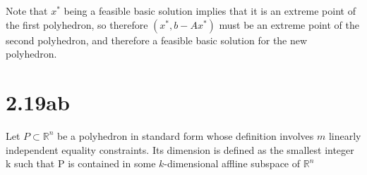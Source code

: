 \documentclass[12pt]{paper}
\newcommand{\setR}{ \mathbb{R} }
\begin{document}
Note that $x^{*}$ being a feasible basic solution implies that it is
an extreme point of the first polyhedron, so therefore $(x^{*}, b -
Ax^{*})$ must be an extreme point of the second polyhedron, and
therefore a feasible basic solution for the new polyhedron.





\section{2.19ab}

Let $P \subset \setR^n$ be a polyhedron in standard form whose definition
involves $m$ linearly independent equality constraints. Its dimension
is defined as the smallest integer k such that P is contained in some
$k$-dimensional affline subspace of $\setR^n$
\end{document}
